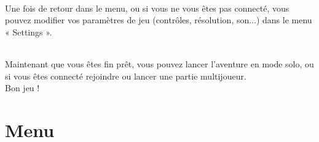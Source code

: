 \documentclass[titlepage, 11px, a4paper]{report}
\begin{document}
\paragraph*{} \hspace{0pt}
Une fois de retour dans le menu, ou si vous ne vous êtes pas connecté, vous pouvez modifier vos paramètres 
de jeu (contrôles, résolution, son...) dans le menu « Settings ». \\


\paragraph*{} \hspace{0pt}
Maintenant que vous êtes fin prêt, vous pouvez lancer l'aventure en mode solo, ou si vous êtes connecté rejoindre 
ou lancer une partie multijoueur. \\ Bon jeu ! \\



\newpage


\part{Menu} 
\end{document}
